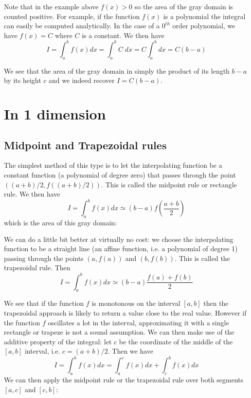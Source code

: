 

Note that in the example above $f(x)>0$ so the area of the gray domain is counted positive.
For example, if the function $f(x)$ is a polynomial the integral can easily be computed 
analytically. In the case of a $0^{th}$ order polynomial, we have $f(x)=C$ where $C$ is a 
constant. We then have 
\begin{equation}
I=\int_a^b f(x) dx = \int_a^b C \; dx  = C \int_a^b dx = C(b-a)
\end{equation}



We see that the area of the gray domain in simply the product of its length $b-a$ by its height $c$
and we indeed recover $I=C(b-a)$.

\section{In 1 dimension}

\subsection{Midpoint and Trapezoidal rules  \label{sec:quad1D}}

The simplest method of this type is to let the interpolating function be 
a constant function (a polynomial of degree zero) that passes through the point $((a+b)/2, f((a+b)/2))$.
This is called the midpoint rule  or rectangle rule. 
We then have 
\[
I=\int_a^b f(x)dx \simeq (b-a) f\left(\frac{a+b}{2}\right)
\]
which is the area of this gray domain:



We can do a little bit better at virtually no cost:
we choose the interpolating function to be a straight line 
(an affine function, i.e. a polynomial of degree 1)
passing through the points $(a, f(a))$ and $(b, f(b))$.
This is called the trapezoidal rule.  
Then 
\[
I=\int_a^b f(x)dx \simeq (b-a) \frac{f(a)+f(b)}{2}
\]



We see that if the function $f$ is monotonous on the interval $[a,b]$ then 
the trapezoidal approach is likely to return a value close to the real value. 
However if the function $f$ oscillates a lot in the interval, approximating it 
with a single rectangle or trapeze is not a sound assumption.
We can then make use of the additive property of the integral: let $c$ 
be the coordinate of the middle of the $[a,b]$ interval, i.e. $c=(a+b)/2$. 
Then we have 
\[
I=\int_a^b f(x)dx = \int_a^c f(x)dx + \int_c^b f(x)dx
\]
We can then apply the midpoint rule or the trapezoidal rule over both segments 
$[a,c]$ and $[c,b]$:

